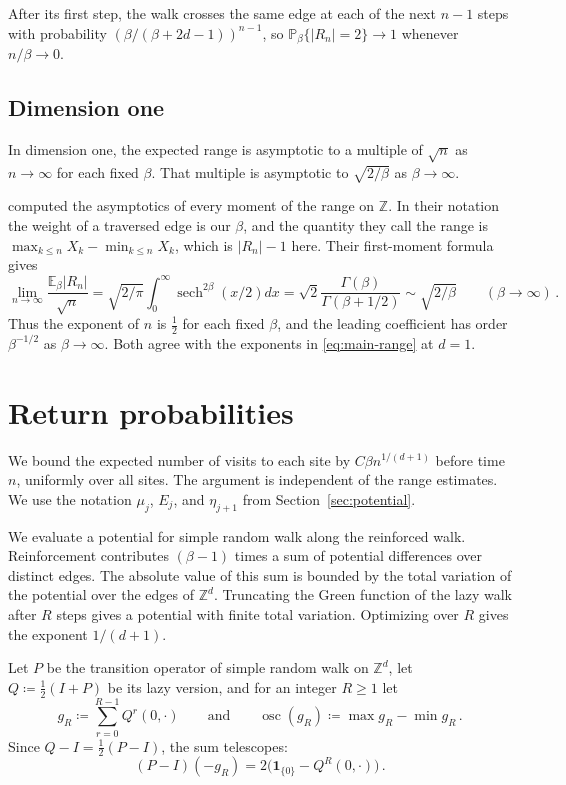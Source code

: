 \documentclass[11pt]{amsart}
\theoremstyle{plain}
\theoremstyle{definition}
\newcommand{\Z}{\mathbb Z}
\renewcommand{\P}{\mathbb P}
\newcommand{\E}{\mathbb E}
\newcommand{\one}{\mathbf 1}
\begin{document}
	After its first step, the walk crosses
	the same edge at each of the next $n-1$ steps with probability
	$(\beta/(\beta+2d-1))^{n-1}$, so $\P_\beta\{|R_n|=2\}\to1$ whenever
	$n/\beta\to0$.

	\subsection{Dimension one}\label{ssec:d1}

	In dimension one, the expected range is asymptotic to a multiple of
	$\sqrt n$ as $n\to\infty$ for each fixed $\beta$. That multiple is asymptotic to
	$\sqrt{2/\beta}$ as $\beta\to\infty$.

	\citet[Theorem~1]{PfaffelhuberStiefel2021} computed the asymptotics of every
	moment of the range on $\Z$. In their notation the weight of a traversed
	edge is our $\beta$, and the quantity they call the range
	is $\max_{k\leq n}X_k-\min_{k\leq n}X_k$, which is $|R_n|-1$ here. Their
	first-moment formula gives
	\[
	\lim_{n\to\infty}\frac{\E_\beta|R_n|}{\sqrt n}
	=\sqrt{2/\pi}\int_0^\infty\operatorname{sech}^{2\beta}(x/2)dx
	=\sqrt2\frac{\Gamma(\beta)}{\Gamma(\beta+1/2)}
	\sim\sqrt{2/\beta}
	\qquad(\beta\to\infty)\, .
	\]
	Thus the exponent of $n$ is $\frac12$ for each fixed $\beta$, and the leading
	coefficient has order $\beta^{-1/2}$ as $\beta\to\infty$.
	Both agree with the exponents in \eqref{eq:main-range} at $d=1$.

	\section{Return probabilities}\label{sec:return}

	We bound the expected number of visits to each site by $C\beta n^{1/(d+1)}$
	before time $n$, uniformly over all sites.
	The argument is independent of the range estimates. We use the notation
	$\mu_j$, $E_j$, and $\eta_{j+1}$ from Section~\ref{sec:potential}.

	We evaluate a potential for simple random walk along the reinforced walk.
	Reinforcement contributes $(\beta-1)$ times a sum of potential differences over
	distinct edges. The absolute value of this sum is bounded by the total
	variation of the potential over the edges of $\Z^d$. Truncating the Green
	function of the lazy walk after $R$ steps gives a potential with finite total
	variation. Optimizing over $R$ gives the exponent $1/(d+1)$.

	Let $P$ be the transition operator of simple random walk on $\Z^d$, let
	$Q\coloneqq\frac12(I+P)$ be its lazy version, and for an integer $R\geq1$ let
	\[
		g_R\coloneqq\sum_{r=0}^{R-1}Q^r(0,\cdot)
		\qquad\text{and}\qquad
		\operatorname{osc}(g_R)\coloneqq\max g_R-\min g_R\, .
	\]
	Since $Q-I=\frac12(P-I)$, the sum telescopes:
	\begin{equation}\label{eq:poisson}
		(P-I)(-g_R)=2\bigl(\one_{\{0\}}-Q^R(0,\cdot)\bigr)\, .
	\end{equation}
\end{document}

